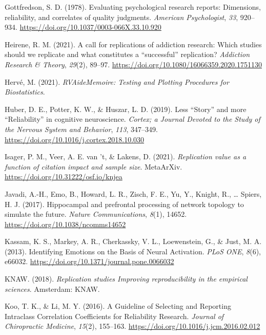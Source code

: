 \documentclass[
  man,floatsintext]{apa6}
\newlength{\cslhangindent}
\newlength{\cslentryspacingunit} %
\newenvironment{CSLReferences}[2] %
 {%
  \setlength{\parindent}{0pt}
  \ifodd #1
  \let\oldpar\par
  \def\par{\hangindent=\cslhangindent\oldpar}
  \fi
  \setlength{\parskip}{#2\cslentryspacingunit}
 }%
 {}
\begin{document}
\begin{CSLReferences}{1}{0}
\leavevmode{}%
Gottfredson, S. D. (1978). Evaluating psychological research reports: {Dimensions}, reliability, and correlates of quality judgments. \emph{American Psychologist}, \emph{33}, 920--934. \url{https://doi.org/10.1037/0003-066X.33.10.920}

\leavevmode{}%
Heirene, R. M. (2021). A call for replications of addiction research: Which studies should we replicate and what constitutes a {``successful''} replication? \emph{Addiction Research \& Theory}, \emph{29}(2), 89--97. \url{https://doi.org/10.1080/16066359.2020.1751130}

\leavevmode{}%
Hervé, M. (2021). \emph{{RVAideMemoire}: {Testing} and {Plotting Procedures} for {Biostatistics}}.

\leavevmode{}%
Huber, D. E., Potter, K. W., \& Huszar, L. D. (2019). Less {``{Story}''} and more {``{Reliability}''} in cognitive neuroscience. \emph{Cortex; a Journal Devoted to the Study of the Nervous System and Behavior}, \emph{113}, 347--349. \url{https://doi.org/10.1016/j.cortex.2018.10.030}

\leavevmode{}%
Isager, P. M., Veer, A. E. van 't, \& Lakens, D. (2021). \emph{Replication value as a function of citation impact and sample size}. {MetaArXiv}. \url{https://doi.org/10.31222/osf.io/knjea}

\leavevmode{}%
Javadi, A.-H., Emo, B., Howard, L. R., Zisch, F. E., Yu, Y., Knight, R., \ldots{} Spiers, H. J. (2017). Hippocampal and prefrontal processing of network topology to simulate the future. \emph{Nature Communications}, \emph{8}(1), 14652. \url{https://doi.org/10.1038/ncomms14652}

\leavevmode{}%
Kassam, K. S., Markey, A. R., Cherkassky, V. L., Loewenstein, G., \& Just, M. A. (2013). Identifying {Emotions} on the {Basis} of {Neural Activation}. \emph{PLoS ONE}, \emph{8}(6), e66032. \url{https://doi.org/10.1371/journal.pone.0066032}

\leavevmode{}%
KNAW. (2018). \emph{Replication studies \textendash{} {Improving} reproducibility in the empirical sciences}. {Amsterdam}: {KNAW}.

\leavevmode{}%
Koo, T. K., \& Li, M. Y. (2016). A {Guideline} of {Selecting} and {Reporting Intraclass Correlation Coefficients} for {Reliability Research}. \emph{Journal of Chiropractic Medicine}, \emph{15}(2), 155--163. \url{https://doi.org/10.1016/j.jcm.2016.02.012}


\end{CSLReferences}
\end{document}
